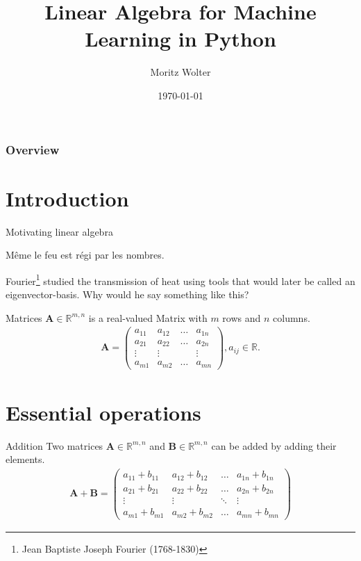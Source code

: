 \documentclass[notes]{beamer}
\title{Linear Algebra for Machine Learning in Python}
\date{\today}
\institute{High-Performance Computing and Analytics Lab, University of Bonn}
\author{Moritz Wolter}
\begin{document}
    \maketitle

    \begin{frame}
    \frametitle{Overview} 
    \tableofcontents
    \end{frame}

    \section{Introduction}
    \begin{frame}{Motivating linear algebra}
      \begin{displayquote}
        Même le feu est régi par les nombres.
      \end{displayquote}
      Fourier\footnote{Jean Baptiste Joseph Fourier (1768-1830)} studied the transmission of heat using tools that would later be called
      an eigenvector-basis.
      Why would he say something like this?
    \end{frame}

    \begin{frame}{Matrices}
      $\mathbf{A} \in \mathbb{R}^{m,n}$ is a real-valued Matrix with $m$ rows and $n$ columns.
      \begin{align}
        \mathbf{A} = \begin{pmatrix}
          a_{11} & a_{12} & \dots & a_{1n} \\
          a_{21} & a_{22} & \dots & a_{2n} \\
          \vdots & \vdots &       & \vdots \\
          a_{m1} & a_{m2} & \dots & a_{mn}
        \end{pmatrix}
      , a_{ij} \in \mathbb{R}.
      \end{align}
     \end{frame}


    \section{Essential operations}
    \begin{frame}{Addition}
      Two matrices $\mathbf{A} \in \mathbb{R}^{m,n}$ and $\mathbf{B} \in \mathbb{R}^{m,n}$ can be added by adding their elements.
      \begin{align}
        \mathbf{A} + \mathbf{B} =
        \begin{pmatrix}
            a_{11} + b_{11} & a_{12} + b_{12} & \dots & a_{1n} + b_{1n} \\
            a_{21} + b_{21} & a_{22} + b_{22} & \dots & a_{2n} + b_{2n} \\
            \vdots          & \vdots          & \ddots & \vdots         \\
            a_{m1} + b_{m1} & a_{m2} + b_{m2} & \dots & a_{mn} + b_{mn}
          \end{pmatrix}
        \end{align}
    \end{frame}
\end{document}
